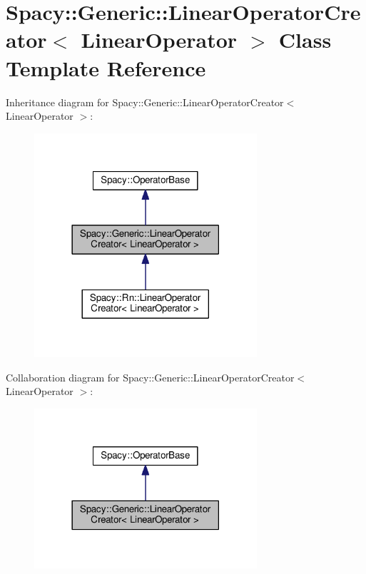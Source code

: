 \hypertarget{classSpacy_1_1Generic_1_1LinearOperatorCreator}{\section{Spacy\-:\-:Generic\-:\-:Linear\-Operator\-Creator$<$ Linear\-Operator $>$ Class Template Reference}
\label{classSpacy_1_1Generic_1_1LinearOperatorCreator}
}


Inheritance diagram for Spacy\-:\-:Generic\-:\-:Linear\-Operator\-Creator$<$ Linear\-Operator $>$\-:
\nopagebreak
\begin{figure}[H]
\begin{center}
\leavevmode
\includegraphics[width=234pt]{classSpacy_1_1Generic_1_1LinearOperatorCreator__inherit__graph}
\end{center}
\end{figure}


Collaboration diagram for Spacy\-:\-:Generic\-:\-:Linear\-Operator\-Creator$<$ Linear\-Operator $>$\-:
\nopagebreak
\begin{figure}[H]
\begin{center}
\leavevmode
\includegraphics[width=234pt]{classSpacy_1_1Generic_1_1LinearOperatorCreator__coll__graph}
\end{center}
\end{figure}
